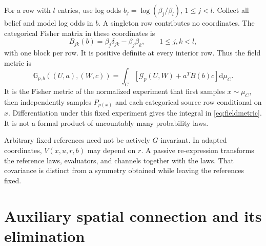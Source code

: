 \documentclass[11pt]{article}
\newcommand{\G}{\mathcal G}
\newcommand{\dd}{\mathrm d}
\begin{document}
For a row with $l$ entries, use log odds $b_j=\log(\beta_j/\beta_l)$, $1\leq j<l$. Collect all belief and model log odds in $b$. A singleton row contributes no coordinates. The categorical Fisher matrix in these coordinates is
\begin{equation}
 B_{jk}(b)=\beta_j\delta_{jk}-\beta_j\beta_k,
 \qquad 1\leq j,k<l,
 \label{eq:B}
\end{equation}
with one block per row. It is positive definite at every interior row. Thus the field metric is
\begin{equation}
 \mathbb G_{p,b}((U,a),(W,c))
 =\int_C[\G_p(U,W)+a^TB(b)c]\dd\mu_C.
 \label{eq:fieldmetric}
\end{equation}
It is the Fisher metric of the normalized experiment that first samples $x\sim\mu_C$, then independently samples $P_{p(x)}$ and each categorical source row conditional on $x$. Differentiation under this fixed experiment gives the integral in \eqref{eq:fieldmetric}. It is not a formal product of uncountably many probability laws.

Arbitrary fixed references need not be actively $G$-invariant. In adapted coordinates, $V(x,u,r,b)$ may depend on $r$. A passive re-expression transforms the reference laws, evaluators, and channels together with the laws. That covariance is distinct from a symmetry obtained while leaving the references fixed.

\section{Auxiliary spatial connection and its elimination}
\end{document}
